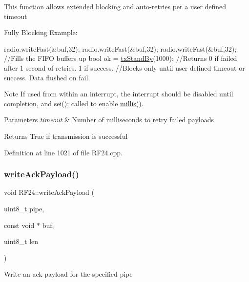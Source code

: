 This function allows extended blocking and auto-\/retries per a user defined timeout 
\begin{DoxyCode}
Fully Blocking Example:

     radio.writeFast(&buf,32);
     radio.writeFast(&buf,32);
     radio.writeFast(&buf,32);   \textcolor{comment}{//Fills the FIFO buffers up}
     \textcolor{keywordtype}{bool} ok = \hyperlink{classRF24_a12cc453453c94969d4d3f0edb3778c83}{txStandBy}(1000);  \textcolor{comment}{//Returns 0 if failed after 1 second of retries. 1 if success.}
                                 \textcolor{comment}{//Blocks only until user defined timeout or success. Data flushed on fail.}
\end{DoxyCode}
 \begin{DoxyNote}{Note}
If used from within an interrupt, the interrupt should be disabled until completion, and sei(); called to enable \hyperlink{group__Porting__General_gad5b3ec1ce839fa1c4337a7d0312e9749}{millis()}. 
\end{DoxyNote}

\begin{DoxyParams}{Parameters}
{\em timeout} & Number of milliseconds to retry failed payloads \\
\hline
\end{DoxyParams}
\begin{DoxyReturn}{Returns}
True if transmission is successful 
\end{DoxyReturn}


Definition at line 1021 of file R\+F24.\+cpp.

\mbox{\label{classRF24_a65619238c25036c3de72dc2c1a1c6e52}} 
\subsubsection{\texorpdfstring{write\+Ack\+Payload()}{writeAckPayload()}}
{\footnotesize\ttfamily void R\+F24\+::write\+Ack\+Payload (\begin{DoxyParamCaption}\item[{uint8\+\_\+t}]{pipe,  }\item[{const void $\ast$}]{buf,  }\item[{uint8\+\_\+t}]{len }\end{DoxyParamCaption})}

Write an ack payload for the specified pipe

